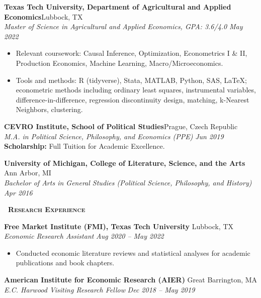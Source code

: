 \documentclass[a4paper,11pt]{article}
\newcommand{\header} [1] {
    {\textsc{\textbf{\Large{\xrfill[0.5ex]{0.5pt}~#1~\xrfill[0.5ex]{0.5pt}}}}}
}
\begin{document}
\vspace{1mm}
\textbf{Texas Tech University, Department of Agricultural and Applied Economics}\hfill Lubbock, TX\\
\textit{Master of Science in Agricultural and Applied Economics, GPA: 3.6/4.0} \hfill  \textit{May 2022}
\begin{itemize}
\item Relevant coursework: Causal Inference, Optimization, Econometrics I \& II, Production Economics, Machine Learning, Macro/Microeconomics.
\item Tools and methods: R (tidyverse), Stata, MATLAB, Python, SAS, \LaTeX; econometric methods including ordinary least squares, instrumental variables, difference-in-difference, regression discontinuity design, matching, k-Nearest Neighbors, clustering.
\end{itemize}

\vspace{1mm}
\textbf{CEVRO Institute, School of Political Studies}\hfill Prague, Czech Republic\\
\textit{M.A. in Political Science, Philosophy, and Economics (PPE)} \hfill  \textit{Jun 2019}\\
\textbf{Scholarship:} Full Tuition for Academic Excellence.

\vspace{1mm}
\textbf{University of Michigan, College of Literature, Science, and the Arts} \hfill Ann Arbor, MI\\
\textit{Bachelor of Arts in General Studies (Political Science, Philosophy, and History)} \hfill  \textit{Apr 2016}

\vspace{1mm}
\header{Research Experience} 

\vspace{1mm}
\textbf{Free Market Institute (FMI), Texas Tech University} \hfill Lubbock, TX\\
\textit{Economic Research Assistant} \hfill  \textit{Aug 2020 -- May 2022} 
\begin{itemize}
\item Conducted economic literature reviews and statistical analyses for academic publications and book chapters.
\end{itemize}

\vspace{1mm}
\textbf{American Institute for Economic Research (AIER)} \hfill Great Barrington, MA\\
\textit{E.C. Harwood Visiting Research Fellow} \hfill  \textit{Dec 2018 -- May 2019}
\end{document}
